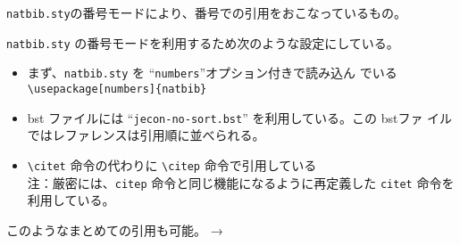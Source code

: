 \documentclass[10pt]{jarticle}
\renewcommand{\citet}[1]{\citep{#1}}
\begin{document}
\verb|natbib.sty|の番号モードにより、番号での引用をおこなっているもの。
\vspace*{1em}

\texttt{natbib.sty} の番号モードを利用するため次のような設定にしている。
\begin{itemize}
 \item まず、\texttt{natbib.sty} を ``\texttt{numbers}''オプション付きで読み込ん
       でいる\\
       \verb|\usepackage[numbers]{natbib}|
 \item bst ファイルには ``\verb|jecon-no-sort.bst|'' を利用している。この bstファ
       イルではレファレンスは引用順に並べられる。
 \item \verb|\citet| 命令の代わりに \verb|\citep| 命令で引用している\\
       注：厳密には、\texttt{citep} 命令と同じ機能になるように再定義した \texttt{citet} 命令を利用している。
\end{itemize}

\vspace{1em}



\vspace{1em}

このようなまとめての引用も可能。 → \citet{40020418914,
yamazaki13:_japan,
takeda2013jecon,
Takeda2012a,
takeda2012_cge,
Takeda2014a,
takeda2019a,
40018847518}

\nocite{*}

%


%

\end{document}
